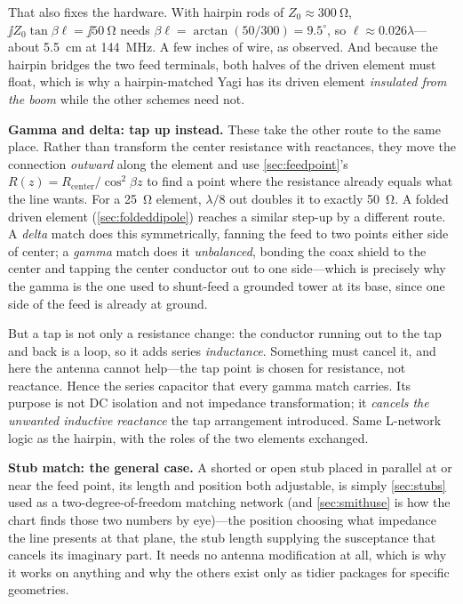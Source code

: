 That also fixes the hardware. With hairpin rods of
\(Z_0\approx\SI{300}{\ohm}\), \(\jj Z_0\tan\beta\ell=\jj\SI{50}{\ohm}\) needs
\(\beta\ell=\arctan(50/300)=9.5^\circ\), so \(\ell\approx0.026\lambda\)---about
\SI{5.5}{\centi\meter} at \SI{144}{\mega\hertz}. A few inches of wire, as observed.
And because the hairpin bridges the two feed terminals, both halves of the driven
element must float, which is why a hairpin-matched Yagi has its driven element
\emph{insulated from the boom} while the other schemes need not.

\textbf{Gamma and delta: tap up instead.} These take the other route to the same
place. Rather than transform the center resistance with reactances, they move the
connection \emph{outward} along the element and use \cref{sec:feedpoint}'s
\(R(z)=R_{\text{center}}/\cos^2\beta z\) to find a point where the resistance already
equals what the line wants. For a \SI{25}{\ohm} element, \(\lambda/8\) out doubles it
to exactly \SI{50}{\ohm}. A folded driven element (\cref{sec:foldeddipole}) reaches a
similar step-up by a different route. A \emph{delta} match does this symmetrically, fanning the
feed to two points either side of center; a \emph{gamma} match does it
\emph{unbalanced}, bonding the coax shield to the center and tapping the center
conductor out to one side---which is precisely why the gamma is the one used to
shunt-feed a grounded tower at its base, since one side of the feed is already at
ground.

But a tap is not only a resistance change: the conductor running out to the tap and
back is a loop, so it adds series \emph{inductance}. Something must cancel it, and
here the antenna cannot help---the tap point is chosen for resistance, not reactance.
Hence the series capacitor that every gamma match carries. Its purpose is not DC
isolation and not impedance transformation; it \emph{cancels the unwanted inductive
reactance} the tap arrangement introduced. Same L-network logic as the hairpin, with
the roles of the two elements exchanged.

\textbf{Stub match: the general case.} A shorted or open stub placed in parallel at or
near the feed point, its length and position both adjustable, is simply
\cref{sec:stubs} used as a two-degree-of-freedom matching network (and
\cref{sec:smithuse} is how the chart finds those two numbers by eye)---the position
choosing what impedance the line presents at that plane, the stub length supplying the
susceptance that cancels its imaginary part. It needs no antenna modification at all,
which is why it works on anything and why the others exist only as tidier packages for
specific geometries.

